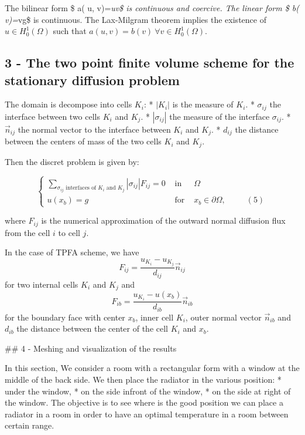\documentclass[11pt]{article}
\begin{document}
The bilinear form \$ a( u,
v)=\int\emph{\Omega \vec\nabla u\cdot\vec\nabla v\$ is continuous and
coercive. The linear form \$ b(
v)=\int}\Omega \vec\nabla v\cdot\vec\nabla g\$ is continuous. The
Lax-Milgram theorem implies the existence of \(u\in H^1_0(\Omega)\) such
that \(a(u,v)=b(v) \: \forall v\in H^1_0(\Omega)\).

\hypertarget{the-two-point-finite-volume-scheme-for-the-stationary-diffusion-problem}{%
\subsection{3 - The two point finite volume scheme for the stationary
diffusion
problem}\label{the-two-point-finite-volume-scheme-for-the-stationary-diffusion-problem}}

The domain is decompose into cells \(K_i\): * \(|K_i|\) is the measure
of \(K_i\). * \(\sigma_{ij}\) the interface between two cells \(K_i\)
and \(K_j\). * \(|\sigma_{ij}|\) the measure of the interface
\(\sigma_{ij}\). * \(\vec{n}_{ij}\) the normal vector to the interface
between \(K_i\) and \(K_j\). * \(d_{ij}\) the distance between the
centers of mass of the two cells \(K_i\) and \(K_j\).

Then the discret problem is given by:

\[\left\{\begin{array}{ccl}
\sum\limits_{\sigma_{ij} \text{ interfaces of } K_i \text{ and } K_j} |\sigma_{ij}|F_{ij} = 0 &\textrm{ in }& \Omega\\[1.5ex]
u(x_b)=g &\textrm{ for } & x_b \in \partial \Omega,    \;\;\;\;\;\;\;\;\;(5)    
       \end{array}
\right.
\]

where \(F_{ij}\) is the numerical approximation of the outward normal
diffusion flux from the cell \(i\) to cell \(j\).

In the case of TPFA scheme, we have
\[F_{ij} = \frac{u_{K_i} - u_{K_j}}{d_{ij}}\vec{n}_{ij}\] for two
internal cells \(K_i\) and \(K_j\) and
\[F_{ib} = \frac{u_{K_i} - u(x_b)}{d_{ib}}\vec{n}_{ib}\] for the
boundary face with center \(x_b\), inner cell \(K_i\), outer normal
vector \(\vec{n}_{ib}\) and \(d_{ib}\) the distance between the center
of the cell \(K_i\) and \(x_b\).

\#\# 4 - Meshing and visualization of the results

In this section, We consider a room with a rectangular form with a
window at the middle of the back side. We then place the radiator in the
various position: * under the window, * on the side infront of the
window, * on the side at right of the window. The objective is to see
where is the good position we can place a radiator in a room in order to
have an optimal temperature in a room between certain range.
\end{document}
